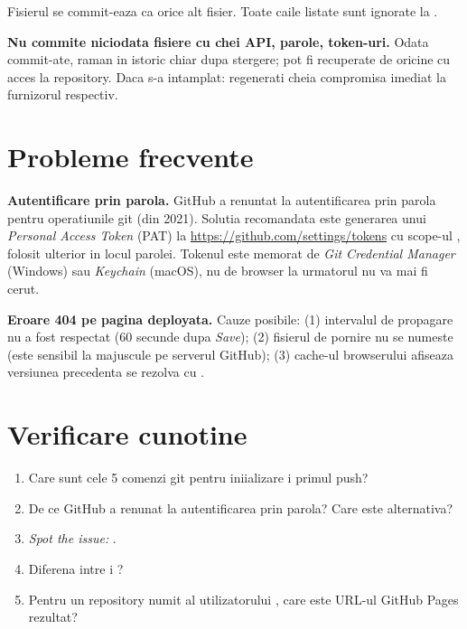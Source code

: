 Fisierul se commit-eaza ca orice alt fisier. Toate caile listate sunt ignorate la .

\begin{atentie}
\textbf{Nu commite niciodata fisiere  cu chei API, parole, token-uri.} Odata commit-ate, raman in istoric chiar dupa stergere; pot fi recuperate de oricine cu acces la repository. Daca s-a intamplat: regenerati cheia compromisa imediat la furnizorul respectiv.
\end{atentie}

\section{Probleme frecvente}

\begin{atentie}
\textbf{Autentificare prin parola.} GitHub a renuntat la autentificarea prin parola pentru operatiunile git (din 2021). Solutia recomandata este generarea unui \emph{Personal Access Token} (PAT) la \url{https://github.com/settings/tokens} cu scope-ul , folosit ulterior in locul parolei. Tokenul este memorat de \emph{Git Credential Manager} (Windows) sau \emph{Keychain} (macOS), nu de browser \textendash{} la urmatorul  nu va mai fi cerut.
\end{atentie}

\begin{atentie}
\textbf{Eroare 404 pe pagina deployata.} Cauze posibile: (1) intervalul de propagare nu a fost respectat (60 secunde dupa \emph{Save}); (2) fisierul de pornire nu se numeste  (este sensibil la majuscule pe serverul GitHub); (3) cache-ul browserului afiseaza versiunea precedenta \textendash{} se rezolva cu .
\end{atentie}

\section*{Verificare cunotine}

\begin{selfcheck}
\begin{enumerate}[itemsep=2pt]
  \item Care sunt cele 5 comenzi git pentru iniializare i primul push?
  \item De ce GitHub a renunat la autentificarea prin parola? Care este alternativa?
  \item \emph{Spot the issue:} .
  \item Diferena intre  i ?
  \item Pentru un repository numit  al utilizatorului , care este URL-ul GitHub Pages rezultat?
\end{enumerate}
\end{selfcheck}

